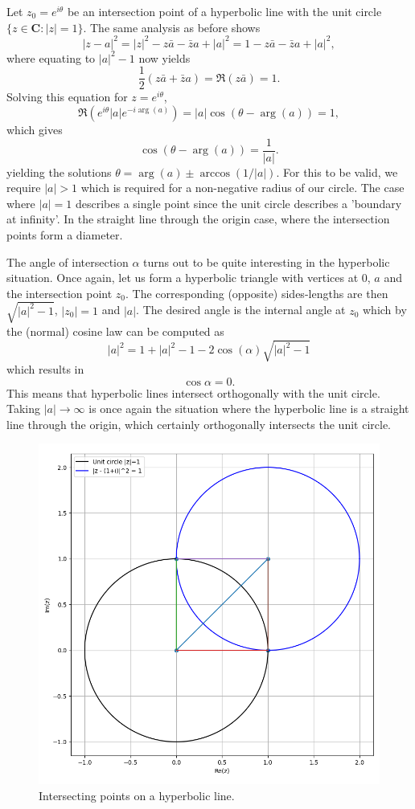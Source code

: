 \documentclass{article}
\begin{document}
Let \(z_0 = e^{i\theta}\) be an intersection point of a hyperbolic line with the unit circle \(\{z \in \mathbf{C}:|z| = 1\}\). The same analysis as before shows
\[ |z-a|^2 = |z|^2 - z\bar{a} - \bar{z}a + |a|^2 = 1 - z\bar{a} - \bar{z}a + |a|^2, \]
where equating to \(|a|^2 - 1\) now yields
\[ \frac{1}{2}(z\bar{a} + \bar{z}a) = \Re(z\bar{a}) = 1. \]
Solving this equation for \(z = e^{i\theta}\),
\[ \Re(e^{i\theta}|a|e^{-i\arg(a)}) = |a|\cos(\theta - \arg(a)) = 1, \]
which gives
\[ \cos(\theta - \arg(a)) = \frac{1}{|a|}. \]
yielding the solutions \(\theta = \arg(a) \pm \arccos(1/|a|)\). For this to be valid, we require \(|a| > 1\) which is required for a non-negative radius of our circle. The case where \(|a| = 1\) describes a single point since the unit circle describes a 'boundary at infinity'. In the straight line through the origin case, where the intersection points form a diameter.

The angle of intersection \(\alpha\) turns out to be quite interesting in the hyperbolic situation. Once again, let us form a hyperbolic triangle with vertices at \(0\), \(a\) and the intersection point \(z_0\). The corresponding (opposite) sides-lengths are then \(\sqrt{|a|^2 - 1}\), \(|z_0| = 1\) and \(|a|\). The desired angle is the internal angle at \(z_0\) which by the (normal) cosine law can be computed as
\[ |a|^2 = 1 + |a|^2 - 1 - 2\cos(\alpha)\sqrt{|a|^2 - 1} \]
which results in
\[ \cos\alpha = 0. \]
This means that hyperbolic lines intersect orthogonally with the unit circle. Taking \(|a| \to \infty\) is once again the situation where the hyperbolic line is a straight line through the origin, which certainly orthogonally intersects the unit circle.

\begin{figure}
    \centering
    \includegraphics[width=1.0\linewidth]{images/hyperbolic_intersect.png}
    \caption{Intersecting points on a hyperbolic line.}
\end{figure}
\end{document}
